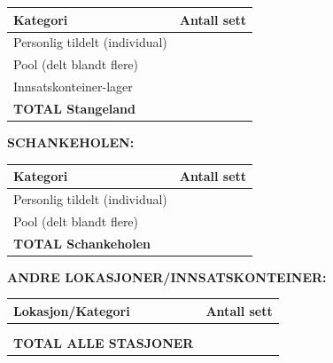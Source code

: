 \documentclass[12pt, a4paper, norsk]{article}
\begin{document}
\begin{center}
\begin{tabular}{|l|c|}
\hline
\textbf{Kategori} & \textbf{Antall sett} \\
\hline
Personlig tildelt (individual) & \underline{\hspace{3cm}} \\
\hline
Pool (delt blandt flere) & \underline{\hspace{3cm}} \\
\hline
Innsatskonteiner-lager & \underline{\hspace{3cm}} \\
\hline
\textbf{TOTAL Stangeland} & \underline{\hspace{3cm}} \\
\hline
\end{tabular}
\end{center}

\vspace{0.5cm}

\noindent
\textbf{SCHANKEHOLEN:}

\begin{center}
\begin{tabular}{|l|c|}
\hline
\textbf{Kategori} & \textbf{Antall sett} \\
\hline
Personlig tildelt (individual) & \underline{\hspace{3cm}} \\
\hline
Pool (delt blandt flere) & \underline{\hspace{3cm}} \\
\hline
\textbf{TOTAL Schankeholen} & \underline{\hspace{3cm}} \\
\hline
\end{tabular}
\end{center}

\vspace{0.5cm}

\noindent
\textbf{ANDRE LOKASJONER/INNSATSKONTEINER:}

\begin{center}
\begin{tabular}{|l|c|}
\hline
\textbf{Lokasjon/Kategori} & \textbf{Antall sett} \\
\hline
\underline{\hspace{5cm}} & \underline{\hspace{2cm}} \\
\hline
\underline{\hspace{5cm}} & \underline{\hspace{2cm}} \\
\hline
\textbf{TOTAL ALLE STASJONER} & \underline{\hspace{2cm}} \\
\hline
\end{tabular}
\end{center}
\end{document}
